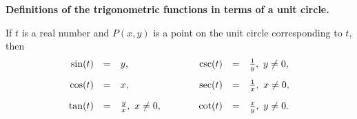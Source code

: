    \noindent\colorbox{blue!10}{%
   \parbox{\dimexpr\linewidth}%
   {%
     \textbf{Definitions of the trigonometric functions in terms of a
       unit circle.}

     If $t$ is a real number and $P(x,y)$ is a point on the unit
     circle corresponding to $t$, then
     \begin{eqnarray*}
       \begin{array}{rcl@{\hspace{4em}}rcl}
         \sin(t) & = & y, & \csc(t) & = & \frac{1}{y},~y\neq 0,\\ [10pt]
         \cos(t) & = & x, & \sec(t) & = & \frac{1}{x},~x\neq 0, \\ [10pt]
         \tan(t) & = & \frac{y}{x},~x\neq 0, & \cot(t) & = & \frac{x}{y},~y\neq 0.
       \end{array}
     \end{eqnarray*}
   }
 }


\newpage









